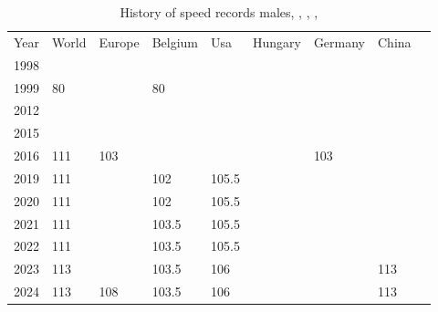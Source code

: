 \begin{table}[]
    \begin{tabular}{lllllllll}
        Year & World & Europe & Belgium & Usa   & Hungary & Germany & China \\
        1998 &       &        &         &       &         &         &       \\
        1999 & 80    &        & 80      &       &         &         &       \\
        2012 &       &        &         &       &         &         &       \\
        2015 &       &        &         &       &         &         &       \\
        2016 & 111   & 103    &         &       &         & 103     &       \\
        2019 & 111   &        & 102     & 105.5 &         &         &       \\
        2020 & 111   &        & 102     & 105.5 &         &         &       \\
        2021 & 111   &        & 103.5   & 105.5 &         &         &       \\
        2022 & 111   &        & 103.5   & 105.5 &         &         &       \\
        2023 & 113   &        & 103.5   & 106   &         &         & 113   \\
        2024 & 113   & 108    & 103.5   & 106   &         &         & 113
    \end{tabular}
    \caption{History of speed records males, \autocite{www_speed_30s_1999_WORLD}, \autocite{www_speed_30s_2024_BE}, \autocite{www_speed_30s_2024_IJRU_WORLD}, \autocite{www_speed_30s_2024_USA_AMJRF}}
    \label{tbl:speed-records-history-male}
\end{table}

